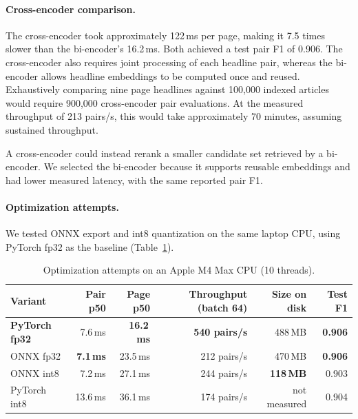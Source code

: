 \documentclass[11pt,letterpaper]{article}
\begin{document}
\paragraph{Cross-encoder comparison.}
The cross-encoder took approximately 122\,ms per page, making it 7.5 times slower than the bi-encoder's 16.2\,ms. Both achieved a test pair F1 of 0.906. The cross-encoder also requires joint processing of each headline pair, whereas the bi-encoder allows headline embeddings to be computed once and reused. Exhaustively comparing nine page headlines against 100,000 indexed articles would require 900,000 cross-encoder pair evaluations. At the measured throughput of 213 pairs/s, this would take approximately 70 minutes, assuming sustained throughput.

A cross-encoder could instead rerank a smaller candidate set retrieved by a bi-encoder. We selected the bi-encoder because it supports reusable embeddings and had lower measured latency, with the same reported pair F1.

\paragraph{Optimization attempts.}
We tested ONNX export and int8 quantization on the same laptop CPU, using PyTorch fp32 as the baseline (Table~\ref{tab:optim}).

\begin{table}[H]
\centering\small
\begin{tabular}{lrrrrr}
\toprule
Variant & Pair p50 & Page p50 & Throughput (batch 64) & Size on disk & Test F1 \\
\midrule
\textbf{PyTorch fp32} & 7.6\,ms & \textbf{16.2\,ms} & \textbf{540 pairs/s} & 488\,MB & \textbf{0.906} \\
ONNX fp32 & \textbf{7.1\,ms} & 23.5\,ms & 212 pairs/s & 470\,MB & \textbf{0.906} \\
ONNX int8 & 7.2\,ms & 27.1\,ms & 244 pairs/s & \textbf{118\,MB} & 0.903 \\
PyTorch int8 & 13.6\,ms & 36.1\,ms & 174 pairs/s & not measured & 0.904 \\
\bottomrule
\end{tabular}
\caption{Optimization attempts on an Apple M4 Max CPU (10 threads).}
\label{tab:optim}
\end{table}
\end{document}
